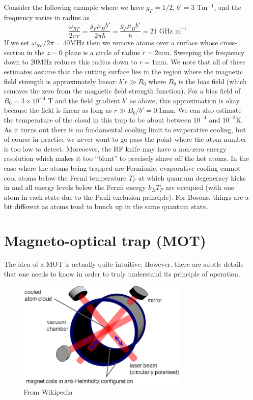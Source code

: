 \documentclass{book}
\theoremstyle{definition}
\newcommand{\f}[2]{\frac{#1}{#2}}
\begin{document}
Consider the following example where we have $g_F = 1/2$, $b' = 3$ Tm$^{-1}$, and the frequency varies in radius as 
\begin{equation*}
\f{\omega_{RF}}{2\pi r } =\f{g_F \mu_B b'}{2\pi \hbar} = \f{g_F \mu_B b'}{h} = 21 \text{ GHz m}^{-1}
\end{equation*}
If we set $\omega_{RF}/2\pi = 40$MHz then we remove atoms over a surface whose cross-section in the $z=0$ plane is a circle of radius $r = 2$mm. Sweeping the frequency down to $20$MHz reduces this radius down to $r = 1$mm. We note that all of these estimates assume that the cutting surface lies in the region where the magnetic field strength is approximately linear: $b'r \gg B_0$ where $B_0$ is the bias field (which removes the zero from the magnetic field strength function). For a bias field of $B_0 = 3\times 10^{-4}$ T and the field gradient $b'$ as above, this approximation is okay because the field is linear as long as $r \gg B_0/b' = 0.1$mm. We can also estimate the temperature of the cloud in this trap to be about between $10^{-4}$ and $10^{-3}$K.\\



As it turns out there is no fundamental cooling limit to evaporative cooling, but of course in practice we never want to go pass the point where the atom number is too low to detect. Moreoever, the RF knife may have a non-zero energy resolution which makes it too ``blunt'' to precisely shave off the hot atoms. In the case where the atoms being trapped are Fermionic, evaporative cooling cannot cool atoms below the Fermi temperature $T_F$ at which quantum degeneracy kicks in and all energy levels below the Fermi energy $k_B T_F$ are occupied (with one atom in each state due to the Pauli exclusion principle). For Bosons, things are a bit different as atoms tend to bunch up in the same quantum state. 






\section*{Magneto-optical trap (MOT)} 

The idea of a MOT is actually quite intuitive. However, there are subtle details that one needs to know in order to truly understand its principle of operation. 

\begin{figure}[!htb]
	\centering
	\includegraphics[width=0.75\textwidth]{images/MOT}
	\caption{From Wikipedia}
\end{figure}
\end{document}
